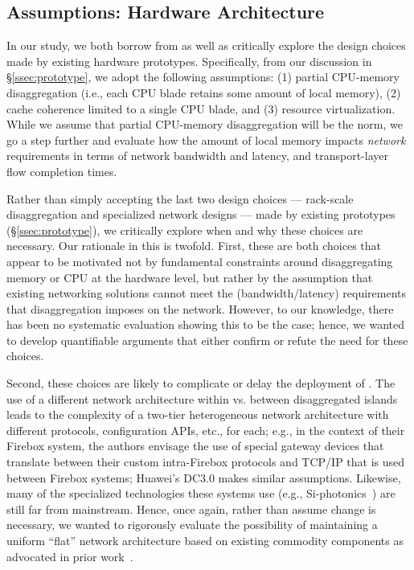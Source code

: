 \vspace{-0.1in}
\subsection{Assumptions: Hardware Architecture}
\vspace{-0.05in}
\label{ssec:hardware}

In our study, we both borrow from  as well as critically explore the design choices made by existing hardware prototypes. Specifically, from our discussion in \S\ref{ssec:prototype}, we adopt the following assumptions: (1) partial CPU-memory disaggregation (i.e., each CPU blade retains some amount of local memory),  (2) cache coherence limited to a single CPU blade, and (3) resource virtualization. 
While we assume that partial CPU-memory disaggregation will be the norm, we go a step further and evaluate how the amount of local memory impacts \emph{network} requirements in terms of network bandwidth and latency, and transport-layer flow completion times.




Rather than simply accepting the last two design choices --- rack-scale disaggregation and specialized network designs --- made by existing prototypes (\S\ref{ssec:prototype}), we critically explore when and why these choices are necessary. Our rationale in this is twofold. 
First, these are both choices that appear to be motivated not by fundamental constraints around disaggregating memory or CPU at the hardware level, but rather by the assumption that existing networking solutions cannot meet the (bandwidth/latency) requirements that disaggregation imposes on the network. However, to our knowledge, there has been no systematic evaluation showing this to be the case; hence, we wanted to develop quantifiable arguments that either confirm or refute the need for these choices. 

Second, these choices are likely to complicate or delay the deployment of \dis. The use of a different network architecture within vs. between disaggregated islands leads to the complexity of a two-tier heterogeneous network architecture with different protocols, configuration APIs, etc., for each; e.g., in the context of their Firebox system, the authors envisage the use of special gateway devices that translate between their custom intra-Firebox protocols and TCP/IP that is used between Firebox systems; Huawei's DC3.0 makes similar assumptions. Likewise, many of the specialized technologies these systems use (e.g., Si-photonics~\cite{vladimir-nature}) are still far from mainstream. 
Hence, once again, rather than assume change is necessary, we wanted to rigorously evaluate the possibility  of maintaining a uniform ``flat'' network architecture based on existing commodity components as advocated in prior work~\cite{el-fares,vl2,greenberg-costs}. 








